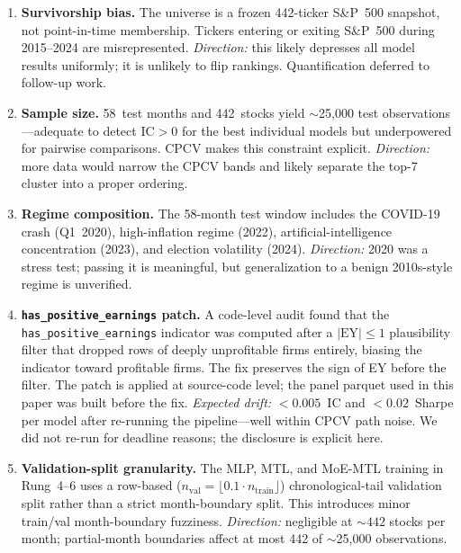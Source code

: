\documentclass[11pt]{article}
\begin{document}
\begin{enumerate}[leftmargin=2em,topsep=2pt,itemsep=4pt]

\item \textbf{Survivorship bias.} The universe is a frozen 442-ticker
  S\&P~500 snapshot, not point-in-time membership. Tickers entering or
  exiting S\&P~500 during 2015--2024 are misrepresented. \emph{Direction:}
  this likely depresses all model results uniformly; it is unlikely to
  flip rankings. Quantification deferred to follow-up work.

\item \textbf{Sample size.} 58~test months and 442~stocks yield
  $\sim$25{,}000 test observations---adequate to detect IC$>0$ for the
  best individual models but underpowered for pairwise comparisons.
  CPCV makes this constraint explicit. \emph{Direction:} more data would
  narrow the CPCV bands and likely separate the top-7 cluster into a
  proper ordering.

\item \textbf{Regime composition.} The 58-month test window includes
  the COVID-19 crash (Q1~2020), high-inflation regime (2022),
  artificial-intelligence concentration (2023), and election volatility
  (2024). \emph{Direction:} 2020 was a stress test; passing it is
  meaningful, but generalization to a benign 2010s-style regime is
  unverified.

\item \textbf{\texttt{has\_positive\_earnings} patch.} A code-level
  audit found that the \texttt{has\_positive\_earnings} indicator was
  computed after a $|\text{EY}|\le 1$ plausibility filter that dropped
  rows of deeply unprofitable firms entirely, biasing the indicator
  toward profitable firms. The fix preserves the sign of EY before the
  filter. The patch is applied at source-code level; the panel
  parquet used in this paper was built before the fix. \emph{Expected
  drift:} $<0.005$~IC and $<0.02$~Sharpe per model after re-running
  the pipeline---well within CPCV path noise. We did not re-run for
  deadline reasons; the disclosure is explicit here.

\item \textbf{Validation-split granularity.} The MLP, MTL, and
  MoE-MTL training in Rung~4--6 uses a row-based
  ($n_\text{val}=\lfloor 0.1\cdot n_\text{train}\rfloor$)
  chronological-tail validation split rather than a strict
  month-boundary split. This introduces minor train/val month-boundary
  fuzziness. \emph{Direction:} negligible at ${\sim}442$ stocks per
  month; partial-month boundaries affect at most 442 of $\sim$25{,}000
  observations.


\end{enumerate}
\end{document}
